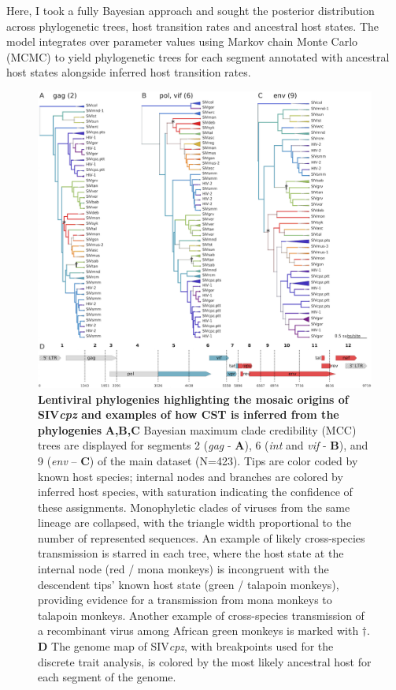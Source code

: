 Here, I took a fully Bayesian approach and sought the posterior distribution across phylogenetic trees, host transition rates and ancestral host states.
The model integrates over parameter values using Markov chain Monte Carlo (MCMC) to yield phylogenetic trees for each segment annotated with ancestral host states alongside inferred host transition rates.

\begin{figure}[ht!]
  \begin{centering}
    \includegraphics[width=.8\linewidth]{./png/siv_cpz.png}
  	\caption[Lentiviral phylogenies highlighting the mosaic origins of SIV\textit{cpz}]{\textbf{Lentiviral phylogenies highlighting the mosaic origins of SIV\textit{cpz} and examples of how CST is inferred from the phylogenies }
\textbf{A,B,C} Bayesian maximum clade credibility (MCC) trees are displayed for segments 2 (\textit{gag} - \textbf{A}), 6 (\textit{int} and \textit{vif} - \textbf{B}), and 9 (\textit{env} – \textbf{C}) of the main dataset (N=423).
Tips are color coded by known host species; internal nodes and branches are colored by inferred host species, with saturation indicating the confidence of these assignments.
Monophyletic clades of viruses from the same lineage are collapsed, with the triangle width proportional to the number of represented sequences.
An example of likely cross-species transmission is starred in each tree, where the host state at the internal node (red / mona monkeys) is incongruent with the descendent tips' known host state (green / talapoin monkeys), providing evidence for a transmission from mona monkeys to talapoin monkeys.
Another example of cross-species transmission of a recombinant virus among African green monkeys is marked with $\dagger$.
\textbf{D} The genome map of SIV\textit{cpz}, with breakpoints used for the discrete trait analysis, is colored by the most likely ancestral host for each segment of the genome.
}
  	\label{siv_cpz}
  \end{centering}
\end{figure}

